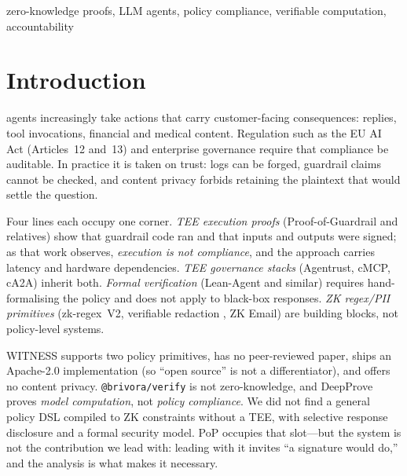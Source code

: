 \documentclass[10pt,journal,compsoc]{IEEEtran}
\newcommand{\need}[1]{}
\newcommand{\need}[1]{\textcolor{blue}{[[ NEED: #1 ]]}}
\begin{document}
\begin{IEEEkeywords}
zero-knowledge proofs, LLM agents, policy compliance, verifiable computation,
accountability
\end{IEEEkeywords}

\section{Introduction}
\label{sec:intro}

 agents increasingly take actions that carry
customer-facing consequences: replies, tool invocations, financial and medical
content. Regulation such as the EU AI Act (Articles~12 and~13) and enterprise
governance require that compliance be auditable. In practice it is taken on
trust: logs can be forged, guardrail claims cannot be checked, and content
privacy forbids retaining the plaintext that would settle the question.

Four lines each occupy one corner. \emph{TEE execution proofs}
(Proof-of-Guardrail and relatives) show that guardrail code ran and that inputs
and outputs were signed; as that work observes, \emph{execution is not
compliance}, and the approach carries latency and hardware dependencies.
\emph{TEE governance stacks} (Agentrust, cMCP, cA2A) inherit both. \emph{Formal
verification} (Lean-Agent and similar) requires hand-formalising the policy and
does not apply to black-box responses. \emph{ZK regex/PII primitives}
(zk-regex~V2, verifiable redaction \cite{vdr}, ZK Email) are building blocks,
not policy-level systems.

WITNESS supports two policy primitives, has no peer-reviewed paper, ships an
Apache-2.0 implementation (so ``open source'' is not a differentiator), and
offers no content privacy. \texttt{@brivora/verify} is not zero-knowledge, and
DeepProve proves \emph{model computation}, not \emph{policy compliance}. We did
not find a general policy DSL compiled to ZK constraints without a TEE, with
selective response disclosure and a formal security model. PoP occupies that
slot---but the system is not the contribution we lead with: leading with it
invites ``a signature would do,'' and the analysis is what makes it necessary.

\need{BLOCKER (citations): Zaguk and Lean-Agent remain unverified/ambiguous
(see \texttt{docs/citation-audit.md}); they must not enter the bibliography.
All eleven existing \texttt{\textbackslash bibitem} entries are verified.}
\end{document}
